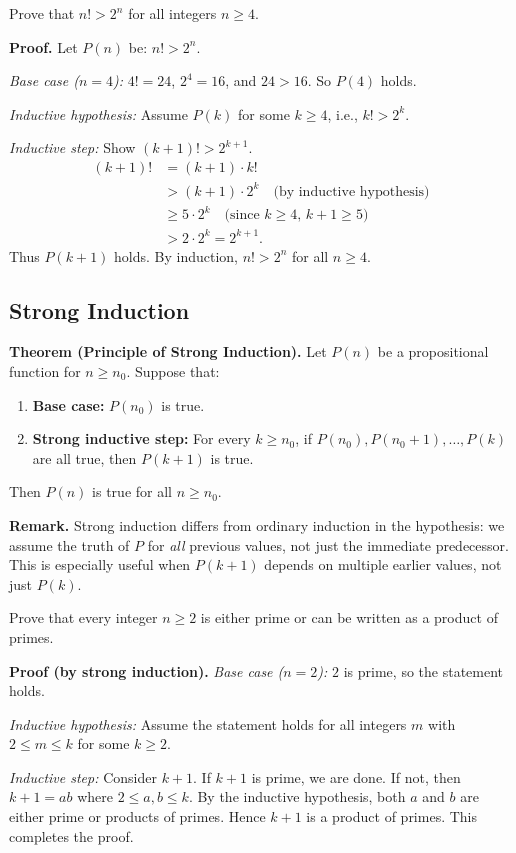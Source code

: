\documentclass[11pt,a4paper]{article}
\begin{document}
\begin{example}
Prove that $n! > 2^n$ for all integers $n \geq 4$.

\textbf{Proof.} Let $P(n)$ be: $n! > 2^n$.

\textit{Base case ($n = 4$):} $4! = 24$, $2^4 = 16$, and $24 > 16$. So $P(4)$ holds.

\textit{Inductive hypothesis:} Assume $P(k)$ for some $k \geq 4$, i.e., $k! > 2^k$.

\textit{Inductive step:} Show $(k+1)! > 2^{k+1}$.
\begin{align*}
    (k+1)! &= (k+1) \cdot k! \\
    &> (k+1) \cdot 2^k \quad \text{(by inductive hypothesis)}\\
    &\geq 5 \cdot 2^k \quad \text{(since } k \geq 4, \, k+1 \geq 5\text{)} \\
    &> 2 \cdot 2^k = 2^{k+1}.
\end{align*}
Thus $P(k+1)$ holds. By induction, $n! > 2^n$ for all $n \geq 4$.
\end{example}

\subsection{Strong Induction}

\textbf{Theorem (Principle of Strong Induction).} Let $P(n)$ be a propositional function for $n \geq n_0$. Suppose that:
\begin{enumerate}[label=(\roman*)]
    \item \textbf{Base case:} $P(n_0)$ is true.
    \item \textbf{Strong inductive step:} For every $k \geq n_0$, if $P(n_0), P(n_0+1), \dots, P(k)$ are all true, then $P(k+1)$ is true.
\end{enumerate}
Then $P(n)$ is true for all $n \geq n_0$.

\textbf{Remark.} Strong induction differs from ordinary induction in the hypothesis: we assume the truth of $P$ for \textit{all} previous values, not just the immediate predecessor. This is especially useful when $P(k+1)$ depends on multiple earlier values, not just $P(k)$.

\begin{example}
Prove that every integer $n \geq 2$ is either prime or can be written as a product of primes.

\textbf{Proof (by strong induction).}
\textit{Base case ($n = 2$):} $2$ is prime, so the statement holds.

\textit{Inductive hypothesis:} Assume the statement holds for all integers $m$ with $2 \leq m \leq k$ for some $k \geq 2$.

\textit{Inductive step:} Consider $k+1$. If $k+1$ is prime, we are done. If not, then $k+1 = ab$ where $2 \leq a, b \leq k$. By the inductive hypothesis, both $a$ and $b$ are either prime or products of primes. Hence $k+1$ is a product of primes. This completes the proof.
\end{example}
\end{document}
